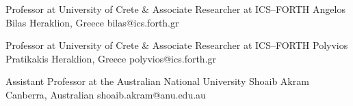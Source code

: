 


\begin{cventries}

  \cventry
    {Professor at University of Crete \& Associate Researcher at ICS--FORTH} %
    {Angelos Bilas} %
    {Heraklion, Greece} %
    {} %
    {
        bilas@ics.forth.gr
    }

  \cventry
    {Professor at University of Crete \& Associate Researcher at ICS--FORTH} %
    {Polyvios Pratikakis} %
    {Heraklion, Greece} %
    {} %
    {
        polyvios@ics.forth.gr
    }


  \cventry
    {Assistant Professor at the Australian National University} %
    {Shoaib Akram} %
    {Canberra, Australian} %
    {} %
    {
		shoaib.akram@anu.edu.au
    }

\end{cventries}
